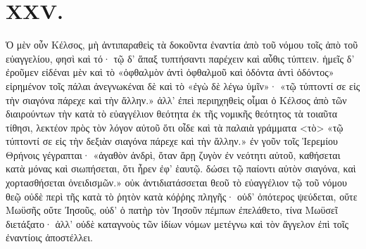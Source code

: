 \section*{XXV.}

Ὁ μὲν οὖν Κέλσος, μὴ ἀντιπαραθεὶς τὰ δοκοῦντα ἐναντία ἀπὸ τοῦ νόμου τοῖς ἀπὸ τοῦ εὐαγγελίου, φησὶ καὶ τό· τῷ δ' ἅπαξ τυπτήσαντι παρέχειν καὶ αὖθις τύπτειν. ἡμεῖς δ' ἐροῦμεν εἰδέναι μὲν καὶ τὸ «ὀφθαλμὸν ἀντὶ ὀφθαλμοῦ καὶ ὀδόντα ἀντὶ ὀδόντος» εἰρημένον τοῖς πάλαι ἀνεγνωκέναι δὲ καὶ τὸ «ἐγὼ δὲ λέγω ὑμῖν»· «τῷ τύπτοντί σε εἰς τὴν σιαγόνα πάρεχε καὶ τὴν ἄλλην.» ἀλλ' ἐπεὶ περιηχηθεὶς οἶμαι ὁ Κέλσος ἀπὸ τῶν διαιρούντων τὴν κατὰ τὸ εὐαγγέλιον θεότητα ἐκ τῆς νομικῆς θεότητος τὰ τοιαῦτα τίθησι, λεκτέον πρὸς τὸν λόγον αὐτοῦ ὅτι οἶδε καὶ τὰ παλαιὰ γράμματα <τὸ> «τῷ τύπτοντί σε εἰς τὴν δεξιὰν σιαγόνα πάρεχε καὶ τὴν ἄλλην.» ἐν γοῦν τοῖς Ἱερεμίου Θρήνοις γέγραπται· «ἀγαθὸν ἀνδρὶ, ὅταν ἄρῃ ζυγὸν ἐν νεότητι αὐτοῦ, καθήσεται κατὰ μόνας καὶ σιωπήσεται, ὅτι ἦρεν ἐφ' ἑαυτῷ. δώσει τῷ παίοντι αὐτὸν σιαγόνα, καὶ χορτασθήσεται ὀνειδισμῶν.» οὐκ ἀντιδιατάσσεται θεοῦ τὸ εὐαγγέλιον τῷ τοῦ νόμου θεῷ οὐδὲ περὶ τῆς κατὰ τὸ ῥητὸν κατὰ κόῤῥης πληγῆς· οὐδ' ὁπότερος ψεύδεται, οὔτε Μωϋσῆς οὔτε Ἰησοῦς, οὐδ' ὁ πατὴρ τὸν Ἰησοῦν πέμπων ἐπελάθετο, τίνα Μωϋσεῖ διετάξατο· ἀλλ' οὐδὲ καταγνοὺς τῶν ἰδίων νόμων μετέγνω καὶ τὸν ἄγγελον ἐπὶ τοῖς ἐναντίοις ἀποστέλλει.